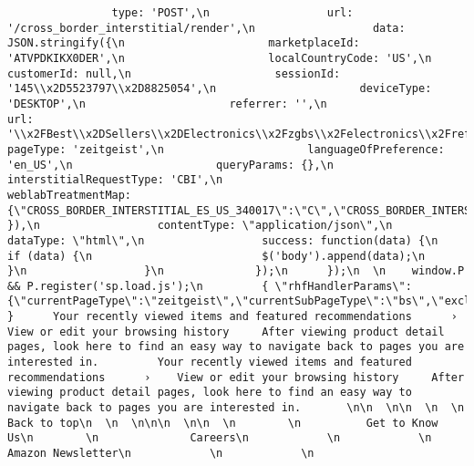 \documentclass[
]{article}
\begin{document}
\begin{verbatim}
                type: 'POST',\n                  url: '/cross_border_interstitial/render',\n                  data: JSON.stringify({\n                      marketplaceId: 'ATVPDKIKX0DER',\n                      localCountryCode: 'US',\n                         customerId: null,\n                      sessionId: '145\\x2D5523797\\x2D8825054',\n                      deviceType: 'DESKTOP',\n                      referrer: '',\n                      url: '\\x2FBest\\x2DSellers\\x2DElectronics\\x2Fzgbs\\x2Felectronics\\x2Fref\\x3Dzg_bs_nav_0',\n                      pageType: 'zeitgeist',\n                      languageOfPreference: 'en_US',\n                      queryParams: {},\n                      interstitialRequestType: 'CBI',\n                      weblabTreatmentMap: {\"CROSS_BORDER_INTERSTITIAL_ES_US_340017\":\"C\",\"CROSS_BORDER_INTERSTITIAL_MX_US_341718\":\"C\",\"CBI_355055\":\"C\",\"NARX_INTERSTITIAL_NEW_CX_372291\":\"C\",\"MWEB_CROSS_BORDER_INTERSTITIAL_SE_366766\":\"T1\",\"MWEB_CROSS_BORDER_INTERSTITIAL_SA_366767\":\"T1\",\"MWEB_CROSS_BORDER_INTERSTITIAL_PL_366768\":\"T1\",\"MWEB_CROSS_BORDER_INTERSTITIAL_NL_366769\":\"T1\",\"CROSS_BORDER_INTERSTITIAL_US_BR_446277\":\"T1\",\"MWEB_CROSS_BORDER_INTERSTITIAL_BR_457908\":\"T1\",\"MWEB_CROSS_BORDER_INTERSTITIAL_BE_459529\":\"C\",\"CROSS_BORDER_INTERSTITIAL_BE_446276\":\"C\",\"NARX_INTERSTITIAL_AUI_MIGRATION_446901\":\"C\",\"NARX_INTERSTITIAL_CX_IMPROVEMENT_446891\":\"T1\",\"BE_LOP_INTERSTITIAL_460676\":\"T1\",\"TEST_ACS_CONFIGURATION_486322\":\"C\",\"CROSS_BORDER_INTERSTITIAL_ACS_SHADOW_TESTING_486317\":\"C\"}\n                  }),\n                  contentType: \"application/json\",\n                  dataType: \"html\",\n                  success: function(data) {\n                      if (data) {\n                          $('body').append(data);\n                      }\n                  }\n              });\n      });\n  \n    window.P && P.register('sp.load.js');\n         { \"rhfHandlerParams\":{\"currentPageType\":\"zeitgeist\",\"currentSubPageType\":\"bs\",\"excludeAsin\":\"\",\"fieldKeywords\":\"\",\"k\":\"\",\"keywords\":\"\",\"search\":\"\",\"auditEnabled\":\"\",\"previewCampaigns\":\"\",\"forceWidgets\":\"\",\"searchAlias\":\"\"} }      Your recently viewed items and featured recommendations      ›    View or edit your browsing history     After viewing product detail pages, look here to find an easy way to navigate back to pages you are interested in.         Your recently viewed items and featured recommendations      ›    View or edit your browsing history     After viewing product detail pages, look here to find an easy way to navigate back to pages you are interested in.       \n\n  \n\n  \n  \n    Back to top\n  \n  \n\n\n  \n\n  \n        \n          Get to Know Us\n        \n              Careers\n            \n            \n              Amazon Newsletter\n            \n            \n   
\end{verbatim}
\end{document}
